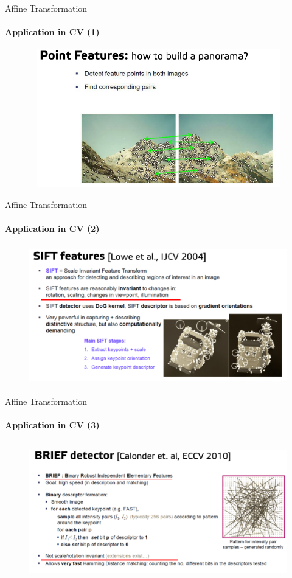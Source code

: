 \documentclass[aspectratio=169]{beamer}
\begin{document}
\begin{frame}[t]{Affine Transformation}
    \framesubtitle{Application in CV (1)}
        \vspace{-0.6cm}
        \begin{figure}[H]
            \centering\includegraphics[height=6cm,width=1\textwidth,keepaspectratio]{cv_intro.png}
            \label{fig:cv_intro.png}
        \end{figure}
    \end{frame}

\begin{frame}[t]{Affine Transformation}
\framesubtitle{Application in CV (2)}
    \vspace{-0.6cm}
    \begin{figure}[H]
        \centering\includegraphics[height=6cm,width=1\textwidth,keepaspectratio]{sift.png}
        \label{fig:sift.png}
    \end{figure}
\end{frame}

\begin{frame}[t]{Affine Transformation}
    \framesubtitle{Application in CV (3)}
        \vspace{-0.6cm}
        \begin{figure}[H]
            \centering\includegraphics[height=6cm,width=1\textwidth,keepaspectratio]{brief.png}
            \label{fig:brief.png}
        \end{figure}
    \end{frame}
\end{document}
